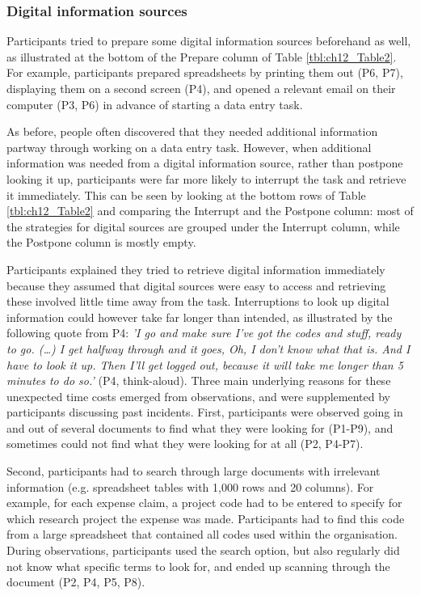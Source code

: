 \subsubsection{Digital information sources}
Participants tried to prepare some digital information sources beforehand as well, as illustrated at the bottom of the Prepare column of Table \ref{tbl:ch12_Table2}. For example, participants prepared spreadsheets by printing them out (P6, P7), displaying them on a second screen (P4), and opened a relevant email on their computer (P3, P6) in advance of starting a data entry task. 

As before, people often discovered that they needed additional information partway through working on a data entry task. However, when additional information was needed from a digital information source, rather than postpone looking it up, participants were far more likely to interrupt the task and retrieve it immediately. This can be seen by looking at the bottom rows of Table \ref{tbl:ch12_Table2}  and comparing the Interrupt and the Postpone column: most of the strategies for digital sources are grouped under the Interrupt column, while the Postpone column is mostly empty.  

Participants explained they tried to retrieve digital information immediately because they assumed that digital sources were easy to access and retrieving these involved little time away from the task. Interruptions to look up digital information could however take far longer than intended, as illustrated by the following quote from P4: \textit{'I go and make sure I’ve got the codes and stuff, ready to go. (…) I get halfway through and it goes, Oh, I don’t know what that is. And I have to look it up. Then I’ll get logged out, because it will take me longer than 5 minutes to do so.'} (P4, think-aloud). Three main underlying reasons for these unexpected time costs emerged from observations, and were supplemented by participants discussing past incidents. First, participants were observed going in and out of several documents to find what they were looking for (P1-P9), and sometimes could not find what they were looking for at all (P2, P4-P7). 

Second, participants had to search through large documents with irrelevant information (e.g. spreadsheet tables with 1,000 rows and 20 columns). For example, for each expense claim, a project code had to be entered to specify for which research project the expense was made. Participants had to find this code from a large spreadsheet that contained all codes used within the organisation. During observations, participants used the search option, but also regularly did not know what specific terms to look for, and ended up scanning through the document (P2, P4, P5, P8). 

